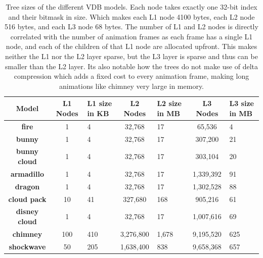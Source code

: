 \begin{table}[htbp]
    \centering
    \begin{tabularx}{\textwidth}{|c|c|X|c|X|c|X|}
    \hline
    \textbf{Model} & \textbf{L1 Nodes} & \textbf{L1 size in KB} & \textbf{L2 Nodes} & \textbf{L2 size in MB} & \textbf{L3 Nodes} & \textbf{L3 size in MB} \\
    \hline
    \textbf{fire} & 1 & 4 & 32,768 & 17 & 65,536 & 4\\
    \hline
    \textbf{bunny} & 1 & 4 & 32,768 & 17 & 307,200 & 21\\
    \hline
    \textbf{bunny cloud} & 1 & 4 & 32,768 & 17 & 303,104 & 20\\
    \hline
    \textbf{armadillo} & 1 & 4 & 32,768 & 17 & 1,339,392 & 91\\
    \hline
    \textbf{dragon} & 1 & 4 & 32,768 & 17 & 1,302,528 & 88\\
    \hline
    \textbf{cloud pack} & 10 & 41 & 327,680 & 168 & 905,216 & 61\\
    \hline
    \textbf{disney cloud} & 1 & 4 & 32,768 & 17 & 1,007,616 & 69\\
    \hline
    \textbf{chimney} & 100 & 410 & 3,276,800 & 1,678 & 9,195,520 & 625\\
    \hline
    \textbf{shockwave} & 50 & 205 & 1,638,400 & 838 & 9,658,368 & 657\\
    \hline
    \end{tabularx}
    \caption{Tree sizes of the different VDB models. Each node takes exactly one 32-bit index and their bitmask in size. Which makes each L1 node 4100 bytes, each L2 node 516 bytes, and each L3 node 68 bytes. The number of L1 and L2 nodes is directly correlated with the number of animation frames as each frame has a single L1 node, and each of the children of that L1 node are allocated upfront. This makes neither the L1 nor the L2 layer sparse, but the L3 layer is sparse and thus can be smaller than the L2 layer. Its also notable how the trees do not make use of delta compression which adds a fixed cost to every animation frame, making long animations like chimney very large in memory.}
    \label{tab:tree_sizes}
\end{table}

